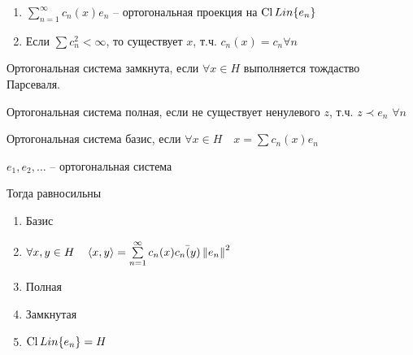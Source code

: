 \begin{remarks}\thmslashn
	
	\begin{enumerate}
		\item 
		$\sum\limits_{n = 1}^\infty c_n(x)e_n$ -- ортогональная проекция на $\operatorname{Cl} Lin\{e_n\}$
		
		\item 
		Если $\sum c_n^2 < \infty$, то существует $x$, т.ч. $c_n(x) = c_n \forall n$
		
	\end{enumerate}
	
\end{remarks}

\begin{definition}\thmslashn
	
	Ортогональная система замкнута, если $\forall x\in H$ выполняется тождаство Парсеваля. 
	
	Ортогональная система полная, если не существует ненулевого $z$, т.ч. $z \prec e_n\,\,\forall n$
	
	Ортогональная система базис, если $\forall x \in H\quad x = \sum c_n(x) e_n$ 
	
\end{definition}

\begin{theorem}\thmslashn 
	
	$e_1, e_2, \ldots$ -- ортогональная система
	
	Тогда равносильны 
	
	\begin{enumerate}
		\item 
		Базис
		
		\item
		$\forall x, y \in H \quad \left\langle x, y\right\rangle = \sum\limits_{n = 1}^{\infty}c_n(x)\bar{c_n(y)} \left\|e_n\right\|^2$
		
		\item
		Полная 
		
		\item
		Замкнутая
		
		\item
		$\operatorname{Cl} Lin\{e_n\} = H$
		
	\end{enumerate}
\end{theorem}

